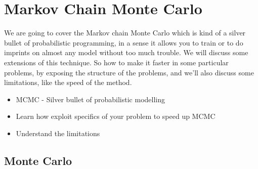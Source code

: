 \documentclass[11pt, oneside, reqno]{amsart}
\numberwithin{equation}{section}
\theoremstyle{plain}%
\theoremstyle{definition}
\theoremstyle{remark}
\begin{document}
\section{Markov Chain Monte Carlo}
We are going to cover the Markov chain Monte Carlo which is kind of a silver bullet of probabilistic programming, in a sense it allows you to train or to do imprints on almost any model without too much trouble. We will discuss some extensions of this technique. So how to make it faster in some particular problems, by exposing the structure of the problems, and we'll also discuss some limitations, like the speed of the method.
\begin{itemize}
	\item MCMC - Silver bullet of probabilistic modelling
	\item Learn how exploit specifics of your problem to speed up MCMC
	\item Understand the limitations
\end{itemize}

\subsection{Monte Carlo}
\end{document}
